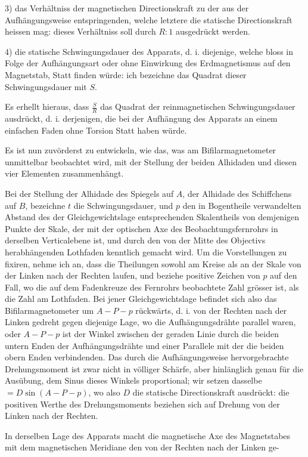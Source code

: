 3) das Verhältniss der magnetischen Directionskraft zu der aus der Aufhängungsweise entspringenden, welche letztere die statische Directionskraft heissen mag: dieses Verhältniss soll durch $R:1$ ausgedrückt werden.

\par\clearpage
{}
4) die statische Schwingungsdauer des Apparats, d. i. diejenige, welche bloss in Folge der Aufhängungsart oder ohne Einwirkung des Erdmagnetismus auf den Magnetstab, Statt finden würde: ich bezeichne das Quadrat dieser Schwingungsdauer mit $S$.

Es erhellt hieraus, dass $\frac{S}{R}$ das Quadrat der reinmagnetischen Schwingungsdauer ausdrückt, d. i. derjenigen, die bei der Aufhängung des Apparats an einem einfachen Faden ohne Torsion Statt haben würde.

Es ist nun zuvörderst zu entwickeln, wie das, was am Bifilarmagnetometer unmittelbar beobachtet wird, mit der Stellung der beiden Alhidaden und diesen vier Elementen zusammenhängt.

Bei der Stellung der Alhidade des Spiegels auf $A$, der Alhidade des Schiffchens auf $B$, bezeichne $t$ die Schwingungsdauer, und $p$ den in Bogentheile verwandelten Abstand des der Gleichgewichtslage entsprechenden Skalentheils von demjenigen Punkte der Skale, der mit der optischen Axe des Beobachtungsfernrohrs in derselben Verticalebene ist, und durch den von der Mitte des Objectivs herabhängenden Lothfaden kenntlich gemacht wird. Um die Vorstellungen zu fixiren, nehme ich an, dass die Theilungen sowohl am Kreise als an der Skale von der Linken nach der Rechten laufen, und beziehe positive Zeichen von $p$ auf den Fall, wo die auf dem Fadenkreuze des Fernrohrs beobachtete Zahl grösser ist, als die Zahl am Lothfaden. Bei jener Gleichgewichtslage befindet sich also das Bifilarmagnetometer um $A-P-p$ rückwärts, d. i. von der Rechten nach der Linken gedreht gegen diejenige Lage, wo die Aufhängungsdrähte parallel waren, oder $A-P-p$ ist der Winkel zwischen der geraden Linie durch die beiden untern Enden der Aufhängungsdrähte und einer Parallele mit der die beiden obern Enden verbindenden. Das durch die Aufhängungsweise hervorgebrachte Drehungsmoment ist zwar nicht in völliger Schärfe, aber hinlänglich genau für die Ausübung, dem Sinus dieses Winkels proportional; wir setzen dasselbe $=D\sin(A-P-p)$, wo also $D$ die statische Directionskraft ausdrückt: die positiven Werthe des Drehungsmoments beziehen sich auf Drehung von der Linken nach der Rechten.

In derselben Lage des Apparats macht die magnetische Axe des Magnetstabes mit dem magnetischen Meridiane den von der Rechten nach der Linken ge-
\par\clearpage
